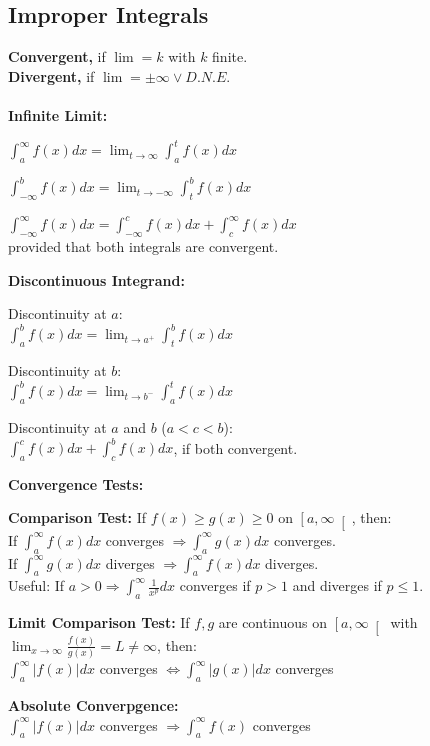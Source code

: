 \documentclass[8pt,a4paper]{extarticle}     %
\theoremstyle{definition}
\theoremstyle{definition}
\theoremstyle{definition}
\begin{document}
\begin{multicols}{4}
\subsection{Improper Integrals}
\textbf{Convergent,} if $\lim = k$ with $k$ finite. \\ 
\textbf{Divergent,} if $\lim = \pm\infty \lor D.N.E.$ \\ \\ 
\textbf{Infinite Limit:}
\begin{eqlist}
	\item $\int_a^\infty f(x)dx = \lim_{t\to\infty}\int_a^t f(x)dx$
	\item $\int_{-\infty}^{b} f(x)dx = \lim_{t\to-\infty}\int_{t}^{b} f(x)dx$
	\item $\int_{-\infty}^{\infty} f(x)dx = \int_{-\infty}^{c} f(x)dx+\int_c^\infty f(x)dx$ \\ provided that both integrals are convergent.
\end{eqlist}
\textbf{Discontinuous Integrand:}
\begin{eqlist}
	\item Discontinuity at $a$: \\ $\int_a^b f(x)dx = \lim_{t\to a^+}\int_t^b f(x)dx$
	\item Discontinuity at $b$: \\ $\int_a^b f(x)dx = \lim_{t\to b^-}\int_a^t f(x)dx$
	\item Discontinuity at $a$ and $b$ ($a<c<b$): \\ $\int_a^c f(x)dx + \int_c^b f(x)dx$, if both convergent. 
\end{eqlist}
\textbf{Convergence Tests:}
\begin{bulletlist}
	\item \textbf{Comparison Test:} If $f(x) \geq g(x) \geq 0$ on $\left[a,\infty\right[$, then: \\ 
	If $\int_a^\infty f(x)dx$ converges $\Rightarrow \int_a^\infty g(x)dx$ converges. \\ 
	If $\int_a^\infty g(x)dx$ diverges $\Rightarrow \int_a^\infty f(x)dx$ diverges. \\ 
	Useful: If $a>0 \Rightarrow \int_a^\infty \frac{1}{x^p}dx$ converges if $p>1$ and diverges if $p\leq1$.
	\item \textbf{Limit Comparison Test:} If $f,g$ are continuous on $\left[a,\infty\right[$ with $\lim_{x\to\infty} \frac{f(x)}{g(x)}=L\neq\infty$, then: \\
	$\int_a^\infty |f(x)|dx$ converges $\Leftrightarrow \int_a^\infty |g(x)|dx$ converges
	\item \textbf{Absolute Converpgence:} \\ $\int_a^\infty |f(x)|dx$ converges $\Rightarrow \int_a^\infty f(x)$ converges

\end{bulletlist}
\end{multicols}
\end{document}
